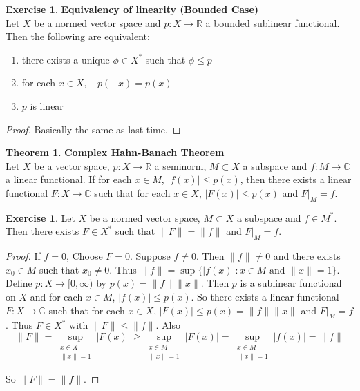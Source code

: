 \documentclass[12pt]{amsart}
\theoremstyle{definition}
\newtheorem{thm}[definition]{Theorem}
\newtheorem{ex}[definition]{Exercise}
\newcommand{\C}{\mathbb{C}}
\newcommand{\R}{\mathbb{R}}
\newcommand{\Rg}{[0,\infty)}
\begin{document}
	\begin{ex}\textbf{Equivalency of linearity (Bounded Case)}\\
	Let $X$ be a normed vector space and $p:X \rightarrow \R$ a bounded sublinear functional. Then the following are equivalent:
	\begin{enumerate}
	\item there exists a unique $\phi \in X^*$ such that $\phi \leq p$
	\item for each $x \in X$, $-p(-x) = p(x)$
	\item $p$ is linear
\end{enumerate}	
	\end{ex}
	
	\begin{proof}
	Basically the same as last time.
	\end{proof}
	
	\begin{thm}\textbf{Complex Hahn-Banach Theorem}\\
		Let $X$ be a vector space, $p:X \rightarrow \R$ a seminorm, $M \subset X$ a subspace and $f:M \rightarrow \C$ a linear functional. If for each $x \in M$, $\vert f(x) \vert \leq p(x)$, then there exists a linear functional $F:X \rightarrow \C$ such that for each $x \in X$, $\vert F(x) \vert \leq p(x)$ and $F|_{M}=f$.
	\end{thm}	
	
	\begin{ex}
		Let $X$ be a normed vector space, $M \subset X$ a subspace and $f \in M^*$. Then there exists $F \in X^*$ such that $\|F \|= \|f \|$ and $F|_M = f$.  
	\end{ex}
	
	\begin{proof}
		If $f =0$, Choose $F=0$. Suppose $f \neq 0$. Then $\|f \|\neq 0$ and there exists $x_0 \in M$ such that $x_0  \neq 0$. Thus $\|f \|= \sup \{ \vert f(x) \vert: x \in M \text{ and } \|x \|= 1\}$. Define $p:X \rightarrow \Rg$ by $ p(x) = \|f \|\|x \|$. Then $p$ is a sublinear functional on $X$ and for each $x \in M$, $\vert f(x) \vert \leq p(x)$. So there exists a linear functional $F:X \rightarrow \C$ such that for each $x \in X$, $\vert F(x) \vert \leq p(x) = \|f \|\|x \|$ and $F|_M = f$. Thus $F \in X^*$ with $\|F \|\leq \|f \|$. Also $$\|F \|= \sup_{\substack{ x \in X \\ \|x \|= 1}} \vert F(x) \vert \geq  \sup_{\substack{ x \in M \\ \|x \|= 1}} \vert F(x) \vert = \sup_{\substack{ x \in M \\ \|x \|= 1}} \vert f(x) \vert = \|f \|$$
		
		So $\|F \|= \|f \|$.
	\end{proof}
	
\end{document}
